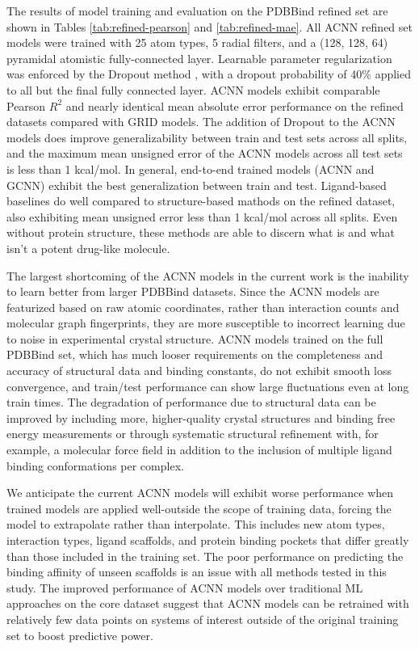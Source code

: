 The results of model training and evaluation on the PDBBind refined set are shown in Tables \ref{tab:refined-pearson} and \ref{tab:refined-mae}.  All ACNN refined set models were trained with 25 atom types, 5 radial filters, and a (128, 128, 64) pyramidal atomistic fully-connected layer.  Learnable parameter regularization was enforced by the Dropout method \cite{srivastava2014dropout}, with a dropout probability of 40\% applied to all but the final fully connected layer.  ACNN models exhibit comparable Pearson $R^2$ and nearly identical mean absolute error performance on the refined datasets compared with GRID models.  The addition of Dropout to the ACNN models does improve generalizability between train and test sets across all splits, and the maximum mean unsigned error of the ACNN models across all test sets is less than 1 kcal/mol.  In general, end-to-end trained models (ACNN and GCNN) exhibit the best generalization between train and test. Ligand-based baselines do well compared to structure-based mathods on the refined dataset, also exhibiting mean unsigned error less than 1 kcal/mol across all splits.  Even without protein structure, these methods are able to discern what is and what isn't a potent drug-like molecule.    

The largest shortcoming of the ACNN models in the current work is the inability to learn better from larger PDBBind datasets. Since the ACNN models are featurized based on raw atomic coordinates, rather than interaction counts and molecular graph fingerprints, they are more susceptible to incorrect learning due to noise in experimental crystal structure.  ACNN models trained on the full PDBBind set, which has much looser requirements on the completeness and accuracy of structural data and binding constants, do not exhibit smooth loss convergence, and train/test performance can show large fluctuations even at long train times.  The degradation of performance due to structural data can be improved by including more, higher-quality crystal structures and binding free energy measurements or through systematic structural refinement with, for example, a molecular force field in addition to the inclusion of multiple ligand binding conformations per complex.

We anticipate the current ACNN models will exhibit worse performance when trained models are applied well-outside the scope of training data, forcing the model to extrapolate rather than interpolate.  This includes new atom types, interaction types, ligand scaffolds, and protein binding pockets that differ greatly than those included in the training set.  The poor performance on predicting the binding affinity of unseen scaffolds is an issue with all methods tested in this study.  The improved performance of ACNN models over traditional ML approaches on the core dataset suggest that ACNN models can be retrained with relatively few data points on systems of interest outside of the original training set to boost predictive power. 

